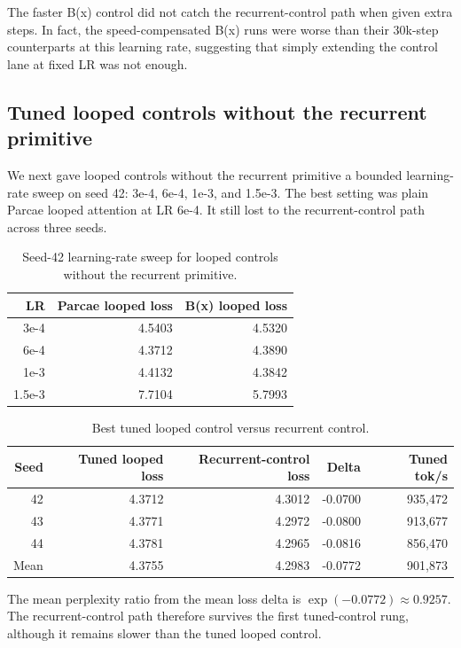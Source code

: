 \documentclass[11pt]{article}
\newcommand{\parcae}{Parcae}
\newcommand{\bx}{B(x)}
\begin{document}
The faster \bx{} control did not catch the recurrent-control path when given extra steps. In
fact, the speed-compensated \bx{} runs were worse than their 30k-step
counterparts at this learning rate, suggesting that simply extending the
control lane at fixed LR was not enough.

\subsection{Tuned looped controls without the recurrent primitive}

We next gave looped controls without the recurrent primitive a bounded
learning-rate sweep on seed 42: 3e-4, 6e-4, 1e-3, and 1.5e-3. The best setting
was plain \parcae{} looped attention at LR 6e-4. It still lost to the
recurrent-control path across three seeds.

\begin{table}[h]
\centering
\caption{Seed-42 learning-rate sweep for looped controls without the recurrent primitive.}
\label{tab:lrsweep}
\begin{tabular}{rrr}
\toprule
LR & \parcae{} looped loss & \bx{} looped loss \\
\midrule
3e-4 & 4.5403 & 4.5320 \\
6e-4 & 4.3712 & 4.3890 \\
1e-3 & 4.4132 & 4.3842 \\
1.5e-3 & 7.7104 & 5.7993 \\
\bottomrule
\end{tabular}
\end{table}

\begin{table}[h]
\centering
\caption{Best tuned looped control versus recurrent control.}
\label{tab:tuned}
\begin{tabular}{rrrrr}
\toprule
Seed & Tuned looped loss & Recurrent-control loss & Delta & Tuned tok/s \\
\midrule
42 & 4.3712 & 4.3012 & -0.0700 & 935,472 \\
43 & 4.3771 & 4.2972 & -0.0800 & 913,677 \\
44 & 4.3781 & 4.2965 & -0.0816 & 856,470 \\
\midrule
Mean & 4.3755 & 4.2983 & -0.0772 & 901,873 \\
\bottomrule
\end{tabular}
\end{table}

The mean perplexity ratio from the mean loss delta is
$\exp(-0.0772) \approx 0.9257$. The recurrent-control path therefore survives
the first tuned-control rung, although it remains slower than the tuned looped
control.
\end{document}
